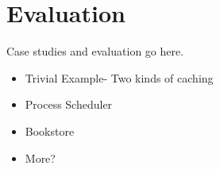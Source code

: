 \section{Evaluation}

Case studies and evaluation go here.
\begin{itemize}
\item Trivial Example- Two kinds of caching
\item Process Scheduler
\item Bookstore
\item More?
\end{itemize}
